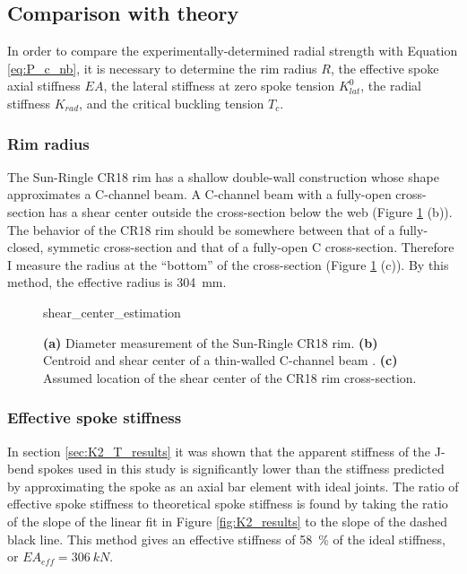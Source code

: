 \documentclass[\rootdir/thesis.tex]{subfiles}
\begin{document}
\subsection{Comparison with theory}

In order to compare the experimentally-determined radial strength with Equation \eqref{eq:P_c_nb}, it is necessary to determine the rim radius $R$, the effective spoke axial stiffness $EA$, the lateral stiffness at zero spoke tension $K_{lat}^0$, the radial stiffness $K_{rad}$, and the critical buckling tension $T_c$.

\subsubsection*{Rim radius}

The Sun-Ringle CR18 rim has a shallow double-wall construction whose shape approximates a C-channel beam. A C-channel beam with a fully-open cross-section has a shear center outside the cross-section below the web \cite{Timoshenko1961} (Figure \ref{fig:shear_center_estimation} (b)). The behavior of the CR18 rim should be somewhere between that of a fully-closed, symmetic cross-section and that of a fully-open C cross-section. Therefore I measure the radius at the ``bottom'' of the cross-section (Figure \ref{fig:shear_center_estimation} (c)). By this method, the effective radius is \SI{304}{mm}.

\begin{figure}[h]
\centering
{shear_center_estimation}
\caption{\textbf{(a)} Diameter measurement of the Sun-Ringle CR18 rim. \textbf{(b)} Centroid and shear center of a thin-walled C-channel beam \cite{Timoshenko1961}. \textbf{(c)} Assumed location of the shear center of the CR18 rim cross-section.}
\label{fig:shear_center_estimation}
\end{figure}

\subsubsection*{Effective spoke stiffness}

In section \ref{sec:K2_T_results} it was shown that the apparent stiffness of the J-bend spokes used in this study is significantly lower than the stiffness predicted by approximating the spoke as an axial bar element with ideal joints. The ratio of effective spoke stiffness to theoretical spoke stiffness is found by taking the ratio of the slope of the linear fit in Figure \ref{fig:K2_results} to the slope of the dashed black line. This method gives an effective stiffness of \SI{58}{\percent} of the ideal stiffness, or $EA_{eff}=\SI{306}{kN}$.
\end{document}
